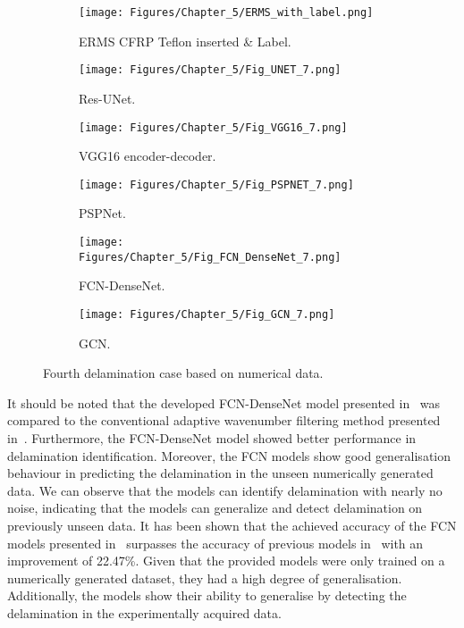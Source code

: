 \begin{figure} [!h]
	\centering
	\begin{subfigure}[b]{.48\textwidth}
		\centering
		\texttt{[image: Figures/Chapter\_5/ERMS\_with\_label.png]}
		\caption{ERMS CFRP Teflon inserted \& Label.}
		\label{fig:ERMS_with_label}
	\end{subfigure}
	\hfill
	\begin{subfigure}[b]{.48\textwidth}
		\centering
		\texttt{[image: Figures/Chapter\_5/Fig\_UNET\_7.png]}
		\caption{Res-UNet.}
		\label{fig:unet_exp_erms}	
	\end{subfigure}
	\hfill
	\begin{subfigure}[b]{.48\textwidth}
		\centering
		\texttt{[image: Figures/Chapter\_5/Fig\_VGG16\_7.png]}
		\caption{VGG16 encoder-decoder.}
		\label{fig:vgg16_exp_erms}
	\end{subfigure}
	\hfill
	\begin{subfigure}[b]{.48\textwidth}
		\centering
		\texttt{[image: Figures/Chapter\_5/Fig\_PSPNET\_7.png]}
		\caption{PSPNet.}
		\label{fig:pspnet_exp_erms}	
	\end{subfigure}
	\hfill
	\begin{subfigure}[b]{.48\textwidth}
		\centering
		\texttt{[image: Figures/Chapter\_5/Fig\_FCN\_DenseNet\_7.png]}
		\caption{FCN-DenseNet.}
		\label{fig:densenet_exp_erms}
	\end{subfigure}
	\hfill
	\begin{subfigure}[b]{.48\textwidth}
		\centering
		\texttt{[image: Figures/Chapter\_5/Fig\_GCN\_7.png]}
		\caption{GCN.}
		\label{fig:gcn_exp_erms}	
	\end{subfigure}
	\caption{Fourth delamination case based on numerical data.}
	\label{fig:exp_erms__case}
\end{figure}


It should be noted that the developed FCN-DenseNet model presented in~\cite{Ijjeh2021} was compared to the conventional adaptive wavenumber filtering method presented in~\cite{Kudela2015, Radzienski2019}.
Furthermore, the FCN-DenseNet model showed better performance in delamination identification.
Moreover, the FCN models show good generalisation behaviour in predicting the delamination in the unseen numerically generated data.
We can observe that the models can identify delamination with nearly no noise, indicating that the models can generalize and detect delamination on previously unseen data.
It has been shown that the achieved accuracy of the FCN models presented in~\cite{Ijjeh2022} surpasses the accuracy of previous models in~\cite{Ijjeh2021} with an improvement of 22.47\%.
Given that the provided models were only trained on a numerically generated dataset, they had a high degree of generalisation.
Additionally, the models show their ability to generalise by detecting the delamination in the experimentally acquired data.